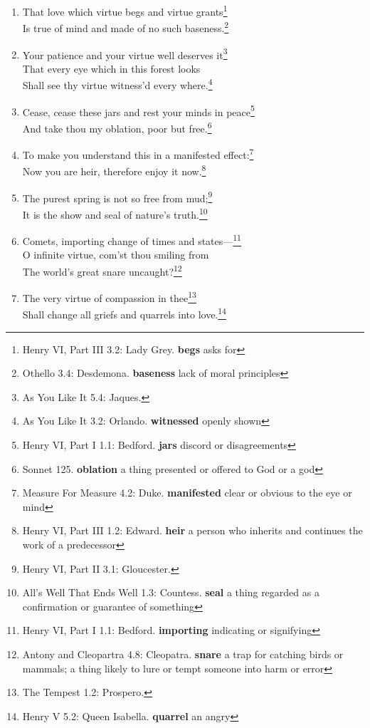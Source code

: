 \documentclass[17pt,twoside]{extarticle}
\begin{document}
\begin{enumerate}
{    Henry.}
\item
  That love which virtue begs and virtue grants\footnote{Henry VI, Part
    III 3.2: Lady Grey. \textbf{begs} asks for}\\Is true of mind and
  made of no such baseness.\footnote{Othello 3.4: Desdemona.
    \textbf{baseness} lack of moral principles}
\item
  Your patience and your virtue well deserves it\footnote{As You Like It
    5.4: Jaques.}\\That every eye which in this forest looks\\Shall see
  thy virtue witness'd every where.\footnote{As You Like It 3.2:
    Orlando. \textbf{witnessed} openly shown}
\item
  Cease, cease these jars and rest your minds in peace\footnote{Henry
    VI, Part I 1.1: Bedford. \textbf{jars} discord or disagreements}\\And
  take thou my oblation, poor but free.\footnote{Sonnet 125.
    \textbf{oblation} a thing presented or offered to God or a god}
\item
  To make you understand this in a manifested effect:\footnote{Measure
    For Measure 4.2: Duke. \textbf{manifested} clear or obvious to the
    eye or mind}\\Now you are heir, therefore enjoy it now.\footnote{Henry
    VI, Part III 1.2: Edward. \textbf{heir} a person who inherits and
    continues the work of a predecessor}
\item
  The purest spring is not so free from mud;\footnote{Henry VI, Part II
    3.1: Gloucester.}\\It is the show and seal of nature's
  truth.\footnote{All's Well That Ends Well 1.3: Countess. \textbf{seal}
    a thing regarded as a confirmation or guarantee of something}
\item
  Comets, importing change of times and states---\footnote{Henry VI,
    Part I 1.1: Bedford. \textbf{importing} indicating or signifying}\\O
  infinite virtue, com'st thou smiling from\\The world's great snare
  uncaught?\footnote{Antony and Cleopartra 4.8: Cleopatra.
    \textbf{snare} a trap for catching birds or mammals; a thing likely
    to lure or tempt someone into harm or error}
\item
  The very virtue of compassion in thee\footnote{The Tempest 1.2:
    Prospero.}\\Shall change all griefs and quarrels into
  love.\footnote{Henry V 5.2: Queen Isabella. \textbf{quarrel} an angry
}
\end{enumerate}
\end{document}

